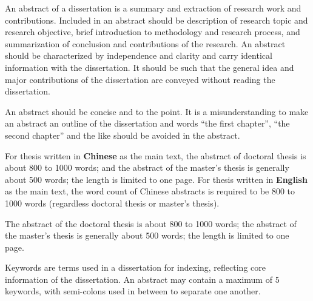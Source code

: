 \begin{abstract*}
  An abstract of a dissertation is a summary and extraction of research work and contributions.
  Included in an abstract should be description of research topic and research objective, brief introduction to methodology and research process, and summarization of conclusion and contributions of the research.
  An abstract should be characterized by independence and clarity and carry identical information with the dissertation.
  It should be such that the general idea and major contributions of the dissertation are conveyed without reading the dissertation.

  An abstract should be concise and to the point.
  It is a misunderstanding to make an abstract an outline of the dissertation and words “the first chapter”, “the second chapter” and the like should be avoided in the abstract.

  For thesis written in \textbf{Chinese} as the main text, the abstract of doctoral thesis is about 800 to 1000 words; and the abstract of the master's thesis is generally about 500 words; the length is limited to one page.
  For thesis written in \textbf{English} as the main text, the word count of Chinese abstracts is required to be 800 to 1000 words (regardless doctoral thesis or master's thesis).

  The abstract of the doctoral thesis is about 800 to 1000 words; the abstract of the master's thesis is generally about 500 words; the length is limited to one page.

  Keywords are terms used in a dissertation for indexing, reflecting core information of the dissertation.
  An abstract may contain a maximum of 5 keywords, with semi-colons used in between to separate one another.

\end{abstract*}

